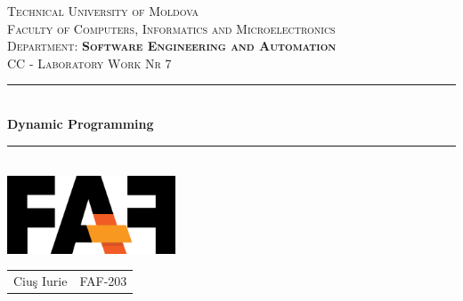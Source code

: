 \documentclass[12pt]{article}
\begin{document}
\newcommand{\HRule}{\rule{\linewidth}{0.2mm}}

\center


\textsc{
    \LARGE Technical University of Moldova
}\\[0cm]

\textsc{
    Faculty of Computers, Informatics and Microelectronics
}\\[0cm]

\textsc{
    Department: \textbf{Software Engineering and Automation}
}\\[4cm]




\textsc{
    \Large CC - Laboratory Work Nr 7
}\\[0cm]




\HRule \\[0.6cm]
{ \huge \bfseries Dynamic Programming}\\[0.1cm]
\HRule \\[1.5cm]




{\includegraphics[width=5cm]{logo.PNG}}\\[1cm]




\begin{center}
    \begin{tabular}{ c c }
        Ciuş Iurie & FAF-203
    \end{tabular}
\end{center}

\end{document}
